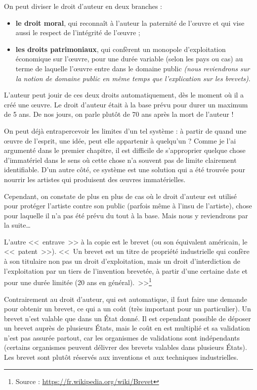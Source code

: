 On peut diviser le droit d'auteur en deux branches :
\begin{itemize}
\item \textbf{le droit moral}, qui reconnaît à l'auteur la paternité de l'œuvre et qui vise aussi le respect de l'intégrité de l'œuvre ;
\item \textbf{les droits patrimoniaux}, qui confèrent un monopole d'exploitation économique sur l'œuvre, pour une durée variable (selon les pays ou cas) au terme de laquelle l'œuvre entre dans le domaine public \textit{(nous reviendrons sur la notion de domaine public en même temps que l'explication sur les brevets)}.
\end{itemize}\bigskip

L'auteur peut jouir de ces deux droits automatiquement, dès le moment où il a créé une œuvre.
Le droit d'auteur était à la base prévu pour durer un maximum de 5 ans.
De nos jours, on parle plutôt de 70 ans après la mort de l'auteur !

On peut déjà entrapercevoir les limites d'un tel système : à partir de quand une œuvre de l'esprit, une idée, peut elle appartenir à quelqu'un ?
Comme je l'ai argumenté dans le premier chapitre, il est difficile de s'approprier quelque chose d'immatériel dans le sens où cette chose n'a souvent pas de limite clairement identifiable.
D'un autre côté, ce système est une solution qui a été trouvée pour nourrir les artistes qui produisent des œuvres immatérielles.

Cependant, on constate de plus en plus de cas où le droit d'auteur est utilisé pour protéger l'artiste contre son public (parfois même à l'insu de l'artiste), chose pour laquelle il n'a pas été prévu du tout à la base.
Mais nous y reviendrons par la suite\dots{}

L'autre <<~entrave~>> à la copie est le brevet (ou son équivalent américain, le <<~patent~>>).
<<~Un brevet est un titre de propriété industrielle qui confère à son titulaire non pas un droit d'exploitation, mais un droit d'interdiction de l'exploitation par un tiers de l'invention brevetée, à partir d'une certaine date et pour une durée limitée (20 ans en général).~>>\footnote{Source : \url{https://fr.wikipedia.org/wiki/Brevet}}

Contrairement au droit d'auteur, qui est automatique, il faut faire une demande pour obtenir un brevet, ce qui a un coût (très important pour un particulier).
Un brevet n'est valable que dans un État donné.
Il est cependant possible de déposer un brevet auprès de plusieurs États, mais le coût en est multiplié et sa validation n'est pas assurée partout, car les organismes de validations sont indépendants (certains organismes peuvent délivrer des brevets valables dans plusieurs États).
Les brevet sont plutôt réservés aux inventions et aux techniques industrielles.

